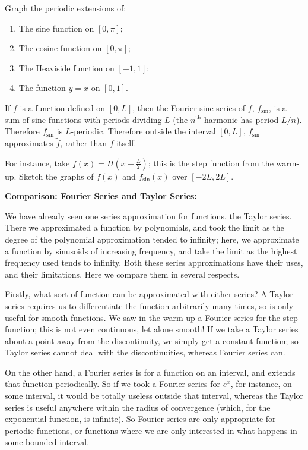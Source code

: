 \documentclass{article}
\begin{document}
Graph the periodic extensions of:
\begin{enumerate}
	\item The sine function on $[0,\pi]$;
	\item The cosine function on $[0,\pi]$;
	\item The Heaviside function on $[-1,1]$;
	\item The function $y=x$ on $[0,1]$.
\end{enumerate}

\bigskip


If $f$ is a function defined on $[0,L]$, then the Fourier sine series of $f$, $f_\mathrm{sin}$, is a sum of sine functions with periods dividing $L$ (the $n^\mathrm{th}$ harmonic has period $L/n$). Therefore $f_\mathrm{sin}$ is $L$-periodic. Therefore outside the interval $[0,L]$, $f_\mathrm{sin}$ approximates $\tilde{f}$, rather than $f$ itself.\medskip

For instance, take $f(x)=H\left(x-\frac{L}{2}\right)$; this is the step function from the warm-up. Sketch the graphs of $f(x)$ and $f_\mathrm{sin}(x)$ over $[-2L,2L]$.



\clearpage




\textbf{Comparison: Fourier Series and Taylor Series:}\bigskip



We have already seen one series approximation for functions, the Taylor series. There we approximated a function by polynomials, and took the limit as the degree of the polynomial approximation tended to infinity; here, we approximate a function by sinusoids of increasing frequency, and take the limit as the highest frequency used tends to infinity. Both these series approximations have their uses, and their limitations. Here we compare them in several respects.\bigskip

Firstly, what sort of function can be approximated with either series? A Taylor series requires us to differentiate the function arbitrarily many times, so is only useful for smooth functions. We saw in the warm-up a Fourier series for the step function; this is not even continuous, let alone smooth! If we take a Taylor series about a point away from the discontinuity, we simply get a constant function; so Taylor series cannot deal with the discontinuities, whereas Fourier series can.

On the other hand, a Fourier series is for a function on an interval, and extends that function periodically. So if we took a Fourier series for $e^x$, for instance, on some interval, it would be totally useless outside that interval, whereas the Taylor series is useful anywhere within the radius of convergence (which, for the exponential function, is infinite). So Fourier series are only appropriate for periodic functions, or functions where we are only interested in what happens in some bounded interval.
\end{document}
